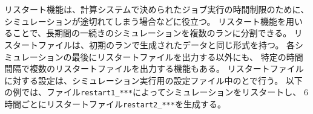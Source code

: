 \section{\SecAdvanceRestart}\label{sec:restart}

リスタート機能は、計算システムで決められたジョブ実行の時間制限のために、
シミュレーションが途切れてしまう場合などに役立つ。
リスタート機能を用いることで、長期間の一続きのシミュレーションを複数のランに分割できる。
リスタートファイルは、初期のランで生成されたデータと同じ形式を持つ。
各シミュレーションの最後にリスタートファイルを出力する以外にも、
特定の時間間隔で複数のリスタートファイルを出力する機能もある。
リスタートファイルに対する設定は、シミュレーション実行用の設定ファイル中のとで行う。
以下の例では、ファイル\verb|restart1_***|によってシミュレーションをリスタートし、
6時間ごとにリスタートファイル\verb|restart2_***|を生成する。

